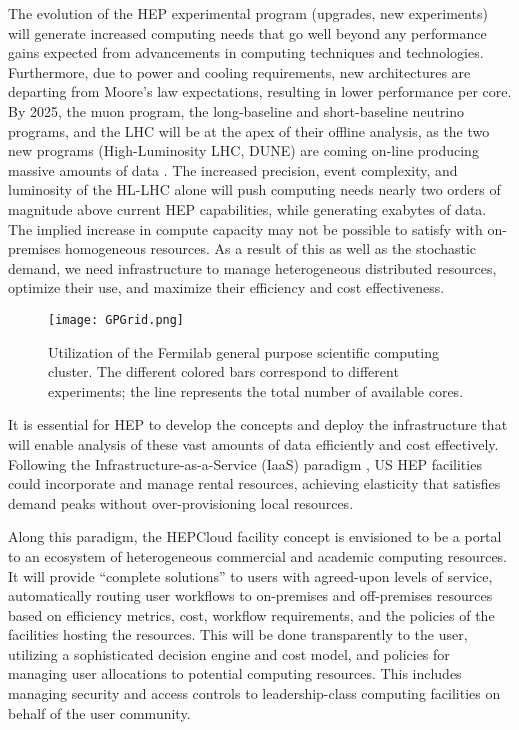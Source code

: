 \documentclass[twocolumn]{svjour3}          %
\begin{document}
The evolution of the HEP experimental program (upgrades, new experiments) will generate increased computing needs that go well beyond any performance gains expected from  advancements in computing techniques and technologies. Furthermore, due to power and cooling requirements, new architectures are departing from Moore's law expectations, resulting in lower performance per core. By 2025, the muon program, the long-baseline and short-baseline neutrino programs, and the LHC will be at the apex of their offline analysis, as the two new programs (High-Luminosity LHC, DUNE) are coming on-line producing massive amounts of data \cite{lhc,hl_lhc,p5}. The increased precision, event complexity, and luminosity of the HL-LHC alone will push computing needs nearly two orders of magnitude above current HEP capabilities, while generating exabytes of data.  The implied increase in compute capacity may not be possible to satisfy with on-premises homogeneous
resources.
As a result of this as well as the stochastic demand, we need infrastructure to manage heterogeneous distributed resources, optimize their use, and maximize their efficiency and cost effectiveness.

\begin{figure}
\centering
\texttt{[image: GPGrid.png]}
\caption{\label{fig:burst}Utilization of the Fermilab general purpose scientific computing cluster. The different colored bars correspond to different
experiments; the line represents the total number of available cores.}
\end{figure}

It is essential for HEP to develop the concepts and deploy the infrastructure that will enable analysis of these vast amounts of data efficiently and cost effectively.
Following the Infrastructure-as-a-Service (IaaS) paradigm \cite{Cloud}, US HEP facilities could incorporate and manage rental resources, achieving elasticity that satisfies demand peaks without over-provisioning local resources.

Along this paradigm, the HEPCloud facility concept is envisioned to be a portal to an ecosystem of heterogeneous commercial and academic computing resources.
It will provide ``complete solutions'' to users with agreed-upon levels of service, automatically routing user workflows to on-premises and off-premises resources
based on efficiency metrics, cost, workflow requirements, and the policies of the facilities hosting the resources. This will be done transparently to the user, utilizing a sophisticated decision engine and cost model, and policies for managing user allocations to potential computing resources. This includes managing
security and access controls to leadership-class computing facilities on behalf
of the user community.
\end{document}
